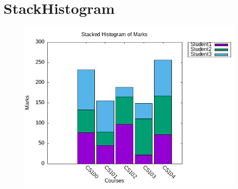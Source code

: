 \documentclass{article}
\begin{document}
	\section*{StackHistogram}
		\begin{figure}[h]
			\centering
			\includegraphics[width=0.7\linewidth]{Stacked_Histogram}
			\caption{}
			\label{fig:stackedhistogram}
		\end{figure}

		
\end{document}
